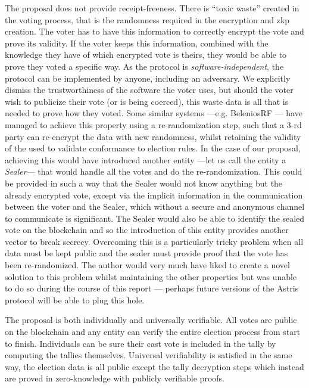 The proposal does not provide receipt-freeness. There is ``toxic waste'' created in the voting process, that is the randomness required in the encryption and \gls{zkp} creation. The voter has to have this information to correctly encrypt the vote and prove its validity. If the voter keeps this information, combined with the knowledge they have of which encrypted vote is theirs, they would be able to prove they voted a specific way. As the protocol is \emph{software-independent}, the protocol can be implemented by anyone, including an adversary. We explicitly dismiss the trustworthiness of the software the voter uses, but should the voter wish to publicize their vote (or is being coerced), this waste data is all that is needed to prove how they voted. Some similar systems ---e.g. BeleniosRF \cite{cortierBeleniosSimplePrivate2019}--- have managed to achieve this property using a re-randomization step, such that a 3-rd party can re-encrypt the data with new randomness, whilst retaining the validity of the  used to validate conformance to election rules. In the case of our proposal, achieving this would have introduced another entity ---let us call the entity a \emph{Sealer}--- that would handle all the votes and do the re-randomization. This could be provided in such a way that the Sealer would not know anything but the already encrypted vote, except via the implicit information in the communication between the voter and the Sealer, which without a secure and anonymous channel to communicate is significant. The Sealer would also be able to identify the sealed vote on the blockchain and so the introduction of this entity provides another vector to break secrecy. Overcoming this is a particularly tricky problem when all data must be kept public and the sealer must provide proof that the vote has been re-randomized. The author would very much have liked to create a novel solution to this problem whilst maintaining the other properties but was unable to do so during the course of this report --- perhaps future versions of the Astris protocol will be able to plug this hole.

The proposal is both individually and universally verifiable. All votes are public on the blockchain and any entity can verify the entire election process from start to finish. Individuals can be sure their cast vote is included in the tally by computing the tallies themselves. Universal verifiability is satisfied in the same way, the election data is all public except the tally decryption steps which instead are proved in zero-knowledge with publicly verifiable proofs.

